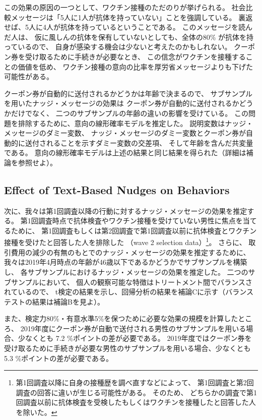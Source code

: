 \documentclass[
  11pt,
  a4paper,
]{article}
\begin{document}
この効果の原因の一つとして、ワクチン接種のただのりが挙げられる。
社会比較メッセージは「5人に1人が抗体を持っていない」ことを強調している。
裏返せば、5人に4人が抗体を持っているということである。
このメッセージを読んだ人は、
仮に風しんの抗体を保有していないとしても、全体の80\% が抗体を持っているので、
自身が感染する機会は少ないと考えたのかもしれない。
クーポン券を受け取るために手続きが必要なとき、
この信念がワクチンを接種することの価値を低め、
ワクチン接種の意向の比率を厚労省メッセージよりも下げた可能性がある。

クーポン券が自動的に送付されるかどうかは年齢で決まるので、
サブサンプルを用いたナッジ・メッセージの効果は
クーポン券が自動的に送付されるかどうかだけでなく、
二つのサブサンプルの年齢の違いの影響を受けている。
この問題を排除するために、意向の線形確率モデルを推定した。
説明変数はナッジ・メッセージのダミー変数、
ナッジ・メッセージのダミー変数とクーポン券が自動的に送付されることを示すダミー変数の交差項、
そして年齢を含んだ共変量である。
意向の線形確率モデルは上述の結果と同じ結果を得られた（詳細は補論を参照せよ）。

\hypertarget{behavior}{%
\subsection{Effect of Text-Based Nudges on Behaviors}\label{behavior}}

次に、我々は第1回調査以降の行動に対するナッジ・メッセージの効果を推定する。
第1回調査時点で抗体検査やワクチン接種を受けていない男性に焦点を当てるために、
第1回調査もしくは第2回調査で第1回調査以前に抗体検査とワクチン接種を受けたと回答した人を排除した
（wave 2 selection data）\footnote{第1回調査以降に自身の接種歴を調べ直すなどによって、
  第1回調査と第2回調査の回答に違いが生じる可能性がある。
  そのため、
  どちらかの調査で第1回調査以前に抗体検査を受検したもしくはワクチンを接種したと回答した人を除いた。}。
さらに、
取引費用の減少の有無のもとでのナッジ・メッセージの効果を推定するために、
我々は2019年4月時点の年齢が46歳以下であるかどうかでサブサンプルを構築し、
各サブサンプルにおけるナッジ・メッセージの効果を推定した。
二つのサブサンプルにおいて、
個人の観察可能な特徴はトリートメント間でバランスされているので、
t検定の結果を示し、回帰分析の結果を補論Cに示す（バランステストの結果は補論Bを見よ）。

また、検定力80\%・有意水準5\%を保つために必要な効果の規模を計算したところ、
2019年度にクーポン券が自動で送付される男性のサブサンプルを用いる場合、少なくとも
7.2
\%ポイントの差が必要である。
2019年度ではクーポン券を受け取るために手続きが必要な男性のサブサンプルを用いる場合、少なくとも
5.3
\%ポイントの差が必要である。
\end{document}
